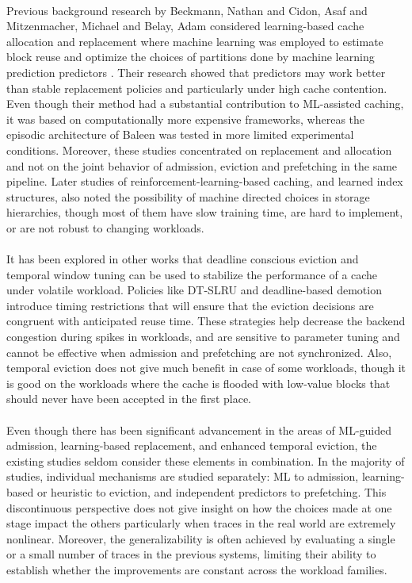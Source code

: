 \documentclass[sigconf]{acmart}
\begin{document}
{\\Previous background research by Beckmann, Nathan and Cidon, Asaf and Mitzenmacher, Michael and Belay, Adam considered learning-based cache allocation and replacement where machine learning was employed to estimate block reuse and optimize the choices of partitions done by machine learning prediction predictors \cite{beckmann2015optimizing}. Their research showed that predictors may work better than stable replacement policies and particularly under high cache contention. Even though their method had a substantial contribution to ML-assisted caching, it was based on computationally more expensive frameworks, whereas the episodic architecture of Baleen was tested in more limited experimental conditions. Moreover, these studies concentrated on replacement and allocation and not on the joint behavior of admission, eviction and prefetching in the same pipeline. Later studies of reinforcement-learning-based caching, and learned index structures, also noted the possibility of machine directed choices in storage hierarchies, though most of them have slow training time, are hard to implement, or are not robust to changing workloads.\\
\\It has been explored in other works that deadline conscious eviction and temporal window tuning can be used to stabilize the performance of a cache under volatile workload. Policies like DT-SLRU and deadline-based demotion introduce timing restrictions that will ensure that the eviction decisions are congruent with anticipated reuse time. These strategies help decrease the backend congestion during spikes in workloads, and are sensitive to parameter tuning and cannot be effective when admission and prefetching are not synchronized. Also, temporal eviction does not give much benefit in case of some workloads, though it is good on the workloads where the cache is flooded with low-value blocks that should never have been accepted in the first place.\\
\\Even though there has been significant advancement in the areas of ML-guided admission, learning-based replacement, and enhanced temporal eviction, the existing studies seldom consider these elements in combination. In the majority of studies, individual mechanisms are studied separately: ML to admission, learning-based or heuristic to eviction, and independent predictors to prefetching. This discontinuous perspective does not give insight on how the choices made at one stage impact the others particularly when traces in the real world are extremely nonlinear. Moreover, the generalizability is often achieved by evaluating a single or a small number of traces in the previous systems, limiting their ability to establish whether the improvements are constant across the workload families.\\
}
\end{document}
